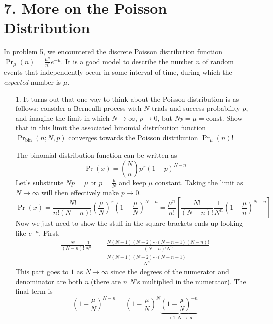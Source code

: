 \documentclass[a4paper,twoside]{article}
\begin{document}
\section*{7. More on the Poisson Distribution}
In problem 5, we encountered the discrete Poisson distribution function $ \Pr_{\mu}(n) = \frac{\mu^n}{n!} e^{- \mu} $. It is a good model to describe the number $ n $ of random events that independently occur in some interval of time, during which the \textit{expected} number is $ \mu $.
\begin{itemize}
    \item[1.] It turns out that one way to think about the Poisson distribution is as follows: consider a Bernoulli process with $ N $ trials and success probability $ p $, and imagine the limit in which $ N \to \infty $, $ p \to 0 $, but $ N p = \mu = \text{const} $. Show that in this limit the associated binomial distribution function $ \Pr_{\text{bin}}(n;N,p) $ converges towards the Poisson distribution $ \Pr_{\mu}(n) $!
        \begin{problem}
            The binomial distribution function can be written as
            \begin{equation}
                \Pr(x) = \binom{N}{n}p^x (1-p)^{N-n}
            \end{equation}
            Let's substitute $ Np = \mu $ or $ p = \frac{\mu}{N} $ and keep $ \mu $ constant. Taking the limit as $ N \to \infty $ will then effectively make $ p \to 0 $.
            \begin{equation}
                \Pr(x) = \frac{N!}{n!(N-n)!} \left( \frac{\mu}{N} \right)^x \left( 1- \frac{\mu}{N} \right)^{N-n} = \frac{\mu^n}{n!} \left[ \frac{N!}{(N-n)!} \frac{1}{N^n} \left( 1- \frac{\mu}{n} \right)^{N-n} \right]
            \end{equation}
            Now we just need to show the stuff in the square brackets ends up looking like $ e^{- \mu} $. First,
            \begin{align}
                \frac{N!}{(N-n)!} \frac{1}{N^n} &= \frac{N(N-1)(N-2)\cdots(N-n+1)(N-n)!}{(N-n)!N^n}\\
                &= \frac{N(N-1)(N-2)\cdots(N-n+1)}{N^n}
            \end{align}
            This part goes to $ 1 $ as $ N \to \infty $ since the degrees of the numerator and denominator are both $ n $ (there are $ n $ $ N $'s multiplied in the numerator).
            The final term is
            \begin{equation}
                \left( 1 - \frac{\mu}{N} \right)^{N-n} = \left( 1 - \frac{\mu}{N} \right)^{N} \underbrace{\left( 1- \frac{\mu}{N} \right)^{-n}}_{\to 1, N \to \infty}

\end{equation}
\end{problem}
\end{itemize}
\end{document}
